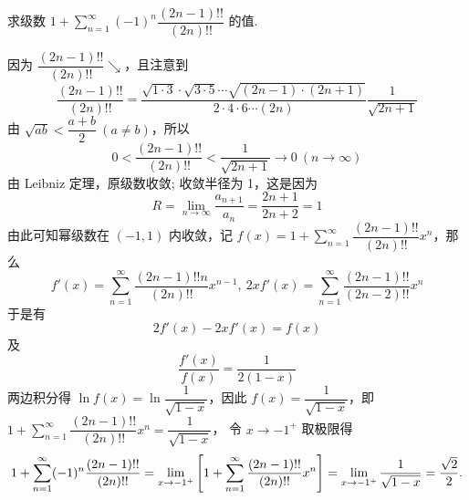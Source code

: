 \begin{example}
    求级数 $1+\displaystyle\sum_{n=1}^{\infty}(-1)^n\dfrac{(2n-1)!!}{(2n)!!}$ 的值.
\end{example}
\begin{solution}
    因为 $\dfrac{(2n-1)!!}{(2n)!!}\searrow$，且注意到 $$\dfrac{(2n-1)!!}{(2n)!!}=\dfrac{\sqrt{1\cdot3}\cdot\sqrt{3\cdot5}\cdots\sqrt{(2n-1)\cdot(2n+1)}}{2\cdot4\cdot6\cdots (2n)}\dfrac{1}{\sqrt{2n+1}}$$
    由 $\sqrt{ab}<\dfrac{a+b}{2}~ (a\neq b)$，所以
    $$0<\dfrac{(2n-1)!!}{(2n)!!}<\dfrac{1}{\sqrt{2n+1}}\to0~ (n\to\infty)$$
    由 Leibniz 定理，原级数收敛;
    收敛半径为 1，这是因为 $$R=\lim_{n\to\infty}\dfrac{a_{n+1}}{a_{n}}=\dfrac{2n+1}{2n+2}=1$$
    由此可知幂级数在 $(-1,1)$ 内收敛，记 $\displaystyle f(x)=1+\sum_{n=1}^{\infty}\dfrac{(2n-1)!!}{(2n)!!}x^n$，那么
    $$f'(x)=\sum_{n=1}^{\infty}\dfrac{(2n-1)!!n}{(2n)!!}x^{n-1},~2xf'(x)=\sum_{n=1}^{\infty}\dfrac{(2n-1)!!}{(2n-2)!!}x^n$$
    于是有 $$2f'(x)-2xf'(x)=f(x)$$
    及 $$\dfrac{f'(x)}{f(x)}=\dfrac{1}{2(1-x)}$$
    两边积分得 $\ln f(x)=\ln\dfrac{1}{\sqrt{1-x}}$，因此 $f(x)=\dfrac{1}{\sqrt{1-x}}$，即 $\displaystyle 1+\sum_{n=1}^{\infty}\dfrac{(2n-1)!!}{(2n)!!}x^n=\dfrac{1}{\sqrt{1-x}}$，
    令 $x\to -1^+$ 取极限得
    $$1+\sum_{n=1}^{\infty}(-1)^n\dfrac{(2n-1)!!}{(2n)!!}=\lim_{x\to-1^+}\qty[1+\sum_{n=1}^{\infty}\dfrac{(2n-1)!!}{(2n)!!}x^n]=\lim_{x\to-1^+}\dfrac{1}{\sqrt{1-x}}=\dfrac{\sqrt{2}}{2}.$$
\end{solution}

